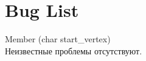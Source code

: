 \chapter{Bug List}
\hypertarget{bug}{}\label{bug}

\begin{DoxyRefList}
\item[Member \doxylink{class_graph_aed06ed279b3734d37dbcff5430ea36d1}{Graph\+::run\+\_\+bfs} (char start\+\_\+vertex)]\hfill \\
\label{bug__bug000001}%
%
Неизвестные проблемы отсутствуют.
\end{DoxyRefList}